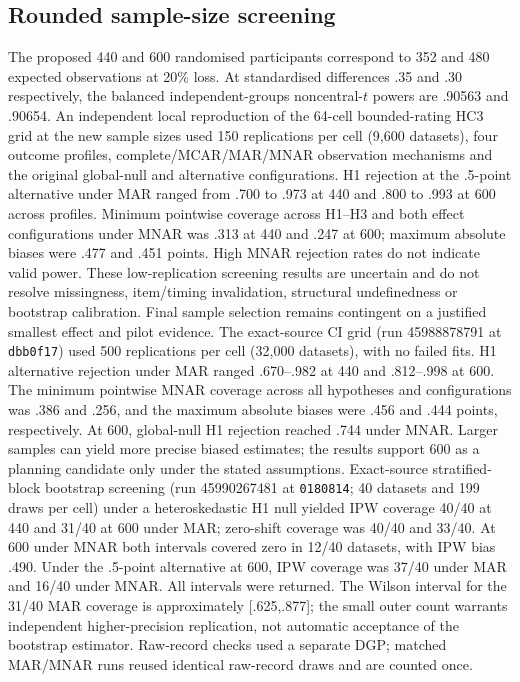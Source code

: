 \documentclass[11pt,a4paper]{article}
\begin{document}
\subsection{Rounded sample-size screening}
The proposed 440 and 600 randomised participants correspond to 352 and 480 expected observations at 20\% loss. At standardised differences .35 and .30 respectively, the balanced independent-groups noncentral-$t$ powers are .90563 and .90654. An independent local reproduction of the 64-cell bounded-rating HC3 grid at the new sample sizes used 150 replications per cell (9,600 datasets), four outcome profiles, complete/MCAR/MAR/MNAR observation mechanisms and the original global-null and alternative configurations. H1 rejection at the .5-point alternative under MAR ranged from .700 to .973 at 440 and .800 to .993 at 600 across profiles. Minimum pointwise coverage across H1--H3 and both effect configurations under MNAR was .313 at 440 and .247 at 600; maximum absolute biases were .477 and .451 points. High MNAR rejection rates do not indicate valid power. These low-replication screening results are uncertain and do not resolve missingness, item/timing invalidation, structural undefinedness or bootstrap calibration. Final sample selection remains contingent on a justified smallest effect and pilot evidence. The exact-source CI grid (run 45988878791 at \texttt{dbb0f17}) used 500 replications per cell (32,000 datasets), with no failed fits. H1 alternative rejection under MAR ranged .670--.982 at 440 and .812--.998 at 600. The minimum pointwise MNAR coverage across all hypotheses and configurations was .386 and .256, and the maximum absolute biases were .456 and .444 points, respectively. At 600, global-null H1 rejection reached .744 under MNAR. Larger samples can yield more precise biased estimates; the results support 600 as a planning candidate only under the stated assumptions. Exact-source stratified-block bootstrap screening (run 45990267481 at \texttt{0180814}; 40 datasets and 199 draws per cell) under a heteroskedastic H1 null yielded IPW coverage 40/40 at 440 and 31/40 at 600 under MAR; zero-shift coverage was 40/40 and 33/40. At 600 under MNAR both intervals covered zero in 12/40 datasets, with IPW bias .490. Under the .5-point alternative at 600, IPW coverage was 37/40 under MAR and 16/40 under MNAR. All intervals were returned. The Wilson interval for the 31/40 MAR coverage is approximately [.625,.877]; the small outer count warrants independent higher-precision replication, not automatic acceptance of the bootstrap estimator. Raw-record checks used a separate DGP; matched MAR/MNAR runs reused identical raw-record draws and are counted once.
\end{document}
